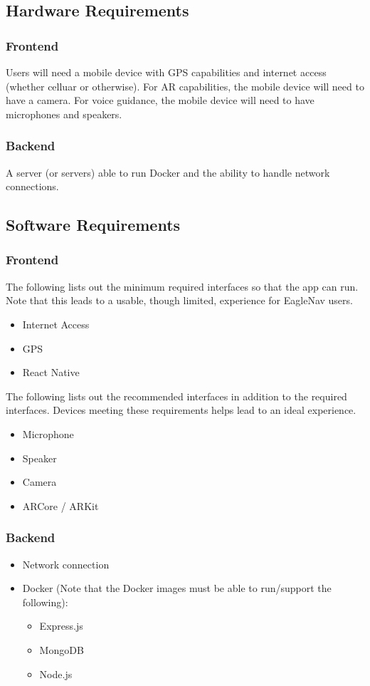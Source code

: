 \documentclass{article}
\begin{document}
\subsection{Hardware Requirements}
\subsubsection{Frontend}
Users will need a mobile device with GPS capabilities and internet access (whether celluar or otherwise). For AR capabilities, the mobile device will need to have a camera. For voice guidance, the mobile device will need to have microphones and speakers.

\subsubsection{Backend}
A server (or servers) able to run Docker and the ability to handle network connections.

\subsection{Software Requirements}
\subsubsection{Frontend}
The following lists out the minimum required interfaces so that the app can run. Note that this leads to a usable, though limited, experience for EagleNav users.
\begin{itemize}
\item{Internet Access}
\item{GPS}
\item{React Native}
\end{itemize}

The following lists out the recommended interfaces in addition to the required interfaces. Devices meeting these requirements helps lead to an ideal experience.
\begin{itemize}
\item{Microphone}
\item{Speaker}
\item{Camera}
\item{ARCore / ARKit}
\end{itemize}

\subsubsection{Backend}
\begin{itemize}
\item{Network connection}
\item{Docker (Note that the Docker images must be able to run/support the following):}
\begin{itemize}
	\item{Express.js}
	\item{MongoDB}
	\item{Node.js}
\end{itemize}
\end{itemize}
\end{document}
